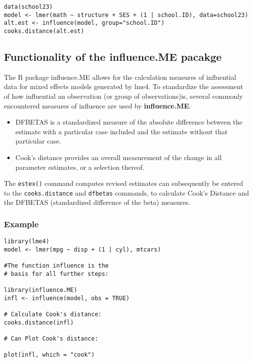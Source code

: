 \documentclass{article}
\begin{document}
\begin{verbatim}
data(school23)
model <- lmer(math ~ structure + SES + (1 | school.ID), data=school23)
alt.est <- influence(model, group="school.ID")
cooks.distance(alt.est)
\end{verbatim}

\subsection{Functionality of the influence.ME pacakge}
The R package influence.ME allows for the calculation measures of influential data for mixed effects models generated by lme4. To standardize the assessment of how influential an observation (or group of observations)is, several commonly encountered measures
of influence are used by \textbf{influence.ME}.


\begin{itemize}
\item DFBETAS is a standardized measure of the absolute difference
between the estimate with a particular case included and the estimate without that particular
case. 
\item Cook’s distance provides an overall measurement of the change in all parameter
estimates, or a selection thereof.
\end{itemize}

The \texttt{estex()} command computes revised estimates can subsequently
be entered to the \texttt{cooks.distance} and \texttt{dfbetas} commands, to calculate Cook’s Distance
and the DFBETAS (standardized difference of the beta) measures.

\subsubsection*{Example}

\begin{framed}
\begin{verbatim}
library(lme4)
model <- lmer(mpg ~ disp + (1 | cyl), mtcars)

#The function influence is the 
# basis for all further steps:

library(influence.ME)
infl <- influence(model, obs = TRUE)

# Calculate Cook's distance:
cooks.distance(infl)

# Can Plot Cook's distance:

plot(infl, which = "cook")
\end{verbatim}
\end{framed}
\end{document}
